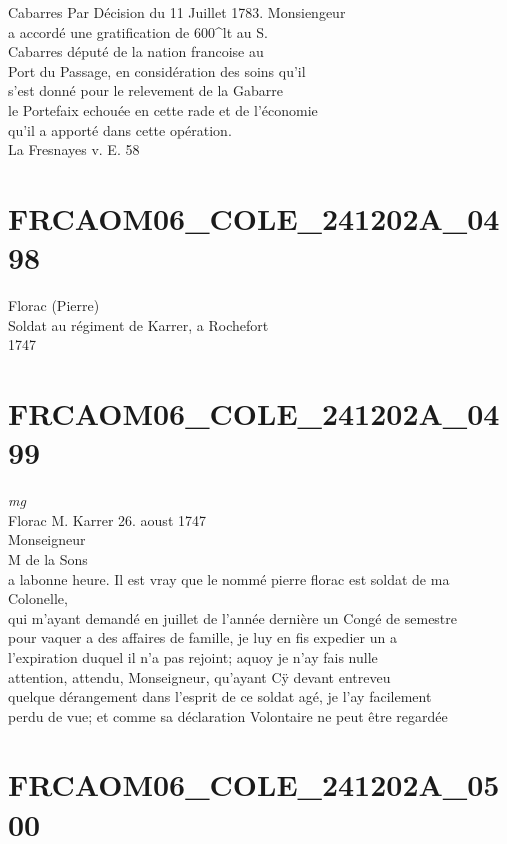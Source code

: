 \documentclass{article}
\begin{document}
\begin{pages}
Cabarres
\normalsize \pstart
Par Décision du 11 Juillet 1783. Monsiengeur\\
a accordé une gratification de 600\^{}lt au S.\\
Cabarres député de la nation francoise au\\
Port du Passage, en considération des soins qu'il\\
s'est donné pour le relevement de la Gabarre\\
le Portefaix echouée en cette rade et de l'économie\\
qu'il a apporté dans cette opération.\\
La Fresnayes
\pend\pstart
v. E. 58
\pend
\endnumbering\beginnumbering\section{FRCAOM06\_COLE\_241202A\_0498}\pstart
Florac (Pierre)\\
Soldat au régiment de Karrer, a Rochefort\\
1747
\pend
\endnumbering\beginnumbering\section{FRCAOM06\_COLE\_241202A\_0499}
\vspace{0.5cm}\noindent
\textit{mg}
\footnotesize \\
Florac
\normalsize \pstart
M. Karrer 26. aoust 1747\\
Monseigneur\\
M de la Sons\\
a labonne heure.
\pend\pstart
Il est vray que le nommé pierre florac est soldat de ma Colonelle,\\
qui m'ayant demandé en juillet de l'année dernière un Congé de semestre\\
pour vaquer a des affaires de famille, je luy en fis expedier un a\\
l'expiration duquel il n'a pas rejoint; aquoy je n'ay fais nulle\\
attention, attendu, Monseigneur, qu'ayant Cÿ devant entreveu\\
quelque dérangement dans l'esprit de ce soldat agé, je l'ay facilement\\
perdu de vue; et comme sa déclaration Volontaire ne peut être regardée
\pend
\endnumbering\beginnumbering\section{FRCAOM06\_COLE\_241202A\_0500}\pstart

\end{pages}
\end{document}
